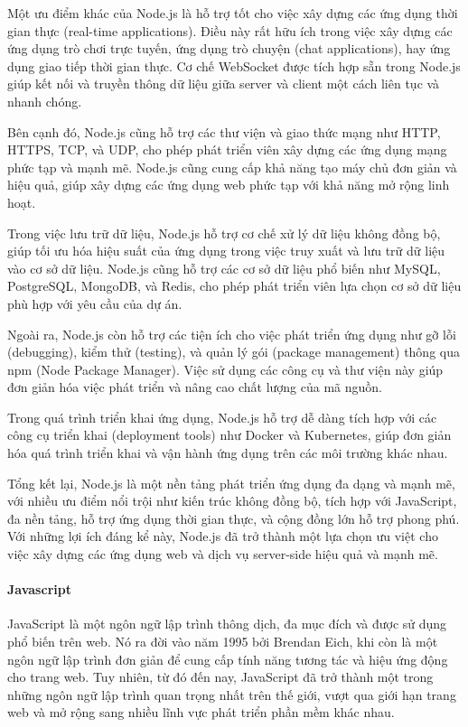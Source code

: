 Một ưu điểm khác của Node.js là hỗ trợ tốt cho việc xây dựng các ứng dụng thời gian thực (real-time applications). Điều này rất hữu ích trong việc xây dựng các ứng dụng trò chơi trực tuyến, ứng dụng trò chuyện (chat applications), hay ứng dụng giao tiếp thời gian thực. Cơ chế WebSocket được tích hợp sẵn trong Node.js giúp kết nối và truyền thông dữ liệu giữa server và client một cách liên tục và nhanh chóng.

Bên cạnh đó, Node.js cũng hỗ trợ các thư viện và giao thức mạng như HTTP, HTTPS, TCP, và UDP, cho phép phát triển viên xây dựng các ứng dụng mạng phức tạp và mạnh mẽ. Node.js cũng cung cấp khả năng tạo máy chủ đơn giản và hiệu quả, giúp xây dựng các ứng dụng web phức tạp với khả năng mở rộng linh hoạt.

Trong việc lưu trữ dữ liệu, Node.js hỗ trợ cơ chế xử lý dữ liệu không đồng bộ, giúp tối ưu hóa hiệu suất của ứng dụng trong việc truy xuất và lưu trữ dữ liệu vào cơ sở dữ liệu. Node.js cũng hỗ trợ các cơ sở dữ liệu phổ biến như MySQL, PostgreSQL, MongoDB, và Redis, cho phép phát triển viên lựa chọn cơ sở dữ liệu phù hợp với yêu cầu của dự án.

Ngoài ra, Node.js còn hỗ trợ các tiện ích cho việc phát triển ứng dụng như gỡ lỗi (debugging), kiểm thử (testing), và quản lý gói (package management) thông qua npm (Node Package Manager). Việc sử dụng các công cụ và thư viện này giúp đơn giản hóa việc phát triển và nâng cao chất lượng của mã nguồn.

Trong quá trình triển khai ứng dụng, Node.js hỗ trợ dễ dàng tích hợp với các công cụ triển khai (deployment tools) như Docker và Kubernetes, giúp đơn giản hóa quá trình triển khai và vận hành ứng dụng trên các môi trường khác nhau.

Tổng kết lại, Node.js là một nền tảng phát triển ứng dụng đa dạng và mạnh mẽ, với nhiều ưu điểm nổi trội như kiến trúc không đồng bộ, tích hợp với JavaScript, đa nền tảng, hỗ trợ ứng dụng thời gian thực, và cộng đồng lớn hỗ trợ phong phú. Với những lợi ích đáng kể này, Node.js đã trở thành một lựa chọn ưu việt cho việc xây dựng các ứng dụng web và dịch vụ server-side hiệu quả và mạnh mẽ.

\paragraph{Javascript}
\mbox{}

JavaScript là một ngôn ngữ lập trình thông dịch, đa mục đích và được sử dụng phổ biến trên web. Nó ra đời vào năm 1995 bởi Brendan Eich, khi còn là một ngôn ngữ lập trình đơn giản để cung cấp tính năng tương tác và hiệu ứng động cho trang web. Tuy nhiên, từ đó đến nay, JavaScript đã trở thành một trong những ngôn ngữ lập trình quan trọng nhất trên thế giới, vượt qua giới hạn trang web và mở rộng sang nhiều lĩnh vực phát triển phần mềm khác nhau.

